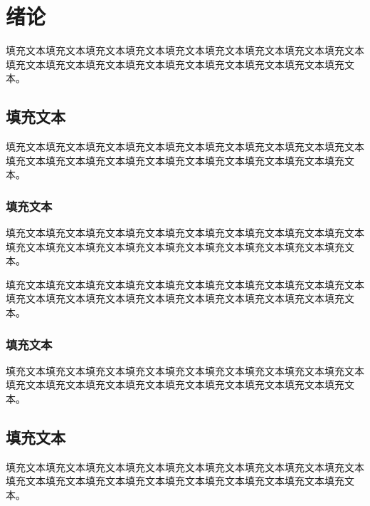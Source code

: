 \chapter{绪论}

填充文本填充文本填充文本填充文本填充文本填充文本填充文本填充文本填充文本填充文本填充文本填充文本填充文本填充文本填充文本填充文本填充文本填充文本。

\section{填充文本}

填充文本填充文本填充文本填充文本填充文本填充文本填充文本填充文本填充文本填充文本填充文本填充文本填充文本填充文本填充文本填充文本填充文本填充文本。

\subsection{填充文本}

填充文本填充文本填充文本填充文本填充文本填充文本填充文本填充文本填充文本填充文本填充文本填充文本填充文本填充文本填充文本填充文本填充文本填充文本。

填充文本填充文本填充文本填充文本填充文本填充文本填充文本填充文本填充文本填充文本填充文本填充文本填充文本填充文本填充文本填充文本填充文本填充文本。

\subsection{填充文本}

填充文本填充文本填充文本填充文本填充文本填充文本填充文本填充文本填充文本填充文本填充文本填充文本填充文本填充文本填充文本填充文本填充文本填充文本。

\section{填充文本}

填充文本填充文本填充文本填充文本填充文本填充文本填充文本填充文本填充文本填充文本填充文本填充文本填充文本填充文本填充文本填充文本填充文本填充文本。
